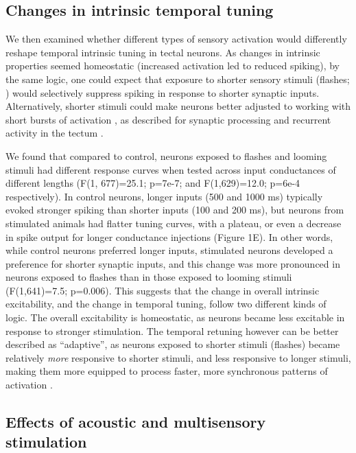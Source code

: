 \documentclass{article}
\begin{document}
\subsection*{Changes in intrinsic temporal tuning}

We then examined whether different types of sensory activation would differently reshape temporal intrinsic tuning in tectal neurons. As changes in intrinsic properties seemed homeostatic (increased activation led to reduced spiking), by the same logic, one could expect that exposure to shorter sensory stimuli (flashes; \citealt{khakhalin2014}) would selectively suppress spiking in response to shorter synaptic inputs. Alternatively, shorter stimuli could make neurons better adjusted to working with short bursts of activation \citep{stemmler1999information}, as  described for synaptic processing \citep{aizenman2007} and recurrent activity in the tectum \citep{pratt2007,shen2011}.

We found that compared to control, neurons exposed to flashes and looming stimuli had different response curves when tested across input conductances of different lengths (F(1, 677)=25.1; p=7e-7; and F(1,629)=12.0; p=6e-4 respectively). In control neurons, longer inputs (500 and 1000 ms) typically evoked stronger spiking than shorter inputs (100 and 200 ms), but neurons from stimulated animals had flatter tuning curves, with a plateau, or even a decrease in spike output for longer conductance injections (Figure 1E). In other words, while control neurons preferred longer inputs, stimulated neurons developed a preference for shorter synaptic inputs, and this change was more pronounced in neurons exposed to flashes than in those exposed to looming stimuli (F(1,641)=7.5; p=0.006). This suggests that the change in overall intrinsic excitability, and the change in temporal tuning, follow two different kinds of logic. The overall excitability is homeostatic, as neurons became less excitable in response to stronger stimulation. The temporal retuning however can be better described as “adaptive”, as neurons exposed to shorter stimuli (flashes) became relatively \textit{more} responsive to shorter stimuli, and less responsive to longer stimuli, making them more equipped to process faster, more synchronous patterns of activation \citep{stemmler1999information,fontaine2014threshold}.

\subsection*{Effects of acoustic and multisensory stimulation}
\end{document}
